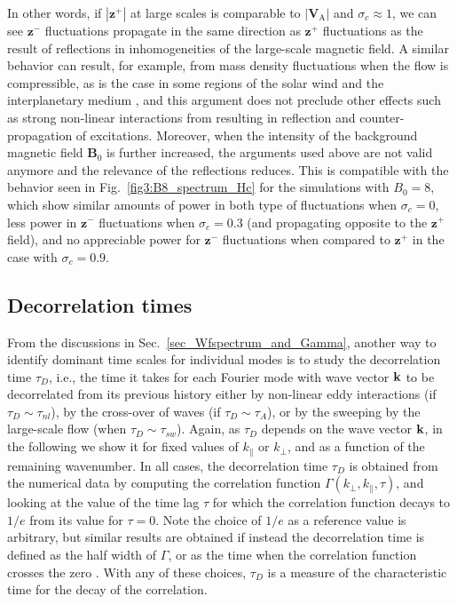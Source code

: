 \documentclass[aip,pop,reprint,amsmath,amssymb,floatfix]{revtex4-1}
\renewcommand{\vec}[1]{\mathbf{#1}}
\begin{document}
In other words, if $|\vec{z}^+|$ at large scales is comparable to
$|\vec{V}_\textrm{A}|$ and $\sigma_c \approx 1$, we can see
$\vec{z}^-$ fluctuations propagate in the same direction as
$\vec{z}^+$ fluctuations as the result of reflections in
inhomogeneities of the large-scale magnetic field. A similar behavior
can result, for example, from mass density fluctuations when the flow
is compressible, as is the case in some regions of the solar wind and
the interplanetary medium \cite{zhou_1989_nonWKBevolution}, and this
argument does not preclude other effects such as strong non-linear
interactions from resulting in reflection and counter-propagation of
excitations. Moreover, when the intensity of the background magnetic
field $\vec{B}_0$ is further increased, the arguments used above are
not valid anymore and the relevance of the reflections reduces. This
is compatible with the behavior seen in Fig.~\ref{fig3:B8_spectrum_Hc}
for the simulations with $B_0=8$, which show similar amounts of power
in both type of fluctuations when $\sigma_c=0$, less power in
$\vec{z}^-$ fluctuations when $\sigma_c=0.3$ (and propagating opposite
to the $\vec{z}^+$ field), and no appreciable power for $\vec{z}^-$
fluctuations when compared to $\vec{z}^+$ in the case with
$\sigma_c=0.9$.

\subsection{Decorrelation times}

From the discussions in Sec.~\ref{sec_Wfspectrum_and_Gamma}, another
way to identify dominant time scales for individual modes is to study
the decorrelation time $\tau_D$, i.e., the time it takes for each
Fourier mode with wave vector ${\bf k}$ to be decorrelated from its
previous history either by non-linear eddy interactions (if $\tau_D
\sim \tau_{nl}$), by the cross-over of waves (if $\tau_D \sim
\tau_A$), or by the sweeping by the large-scale flow (when $\tau_D
\sim \tau_{sw}$). Again, as $\tau_D$ depends on the wave vector ${\bf
  k}$, in the following we show it for fixed values of $k_\parallel$
or $k_\perp$, and as a function of the remaining wavenumber. In all
cases, the decorrelation time $\tau_D$ is obtained from the numerical
data by computing the correlation function
$\Gamma(k_{\perp},k_{\parallel},\tau)$, and looking at the value of
the time lag $\tau$ for which the correlation function decays to $1/e$
from its value for $\tau=0$. Note the choice of $1/e$ as a reference
value is arbitrary, but similar results are obtained if instead 
the decorrelation time is defined as the half width of $\Gamma$, or as the time when the correlation function crosses the zero 
\cite{lugones_2016_spatiotemporal, 
clark_di_leoni_quantification_2014}. With any of these choices,
$\tau_D$ is a measure of the characteristic time for the decay of the 
correlation.
\end{document}
